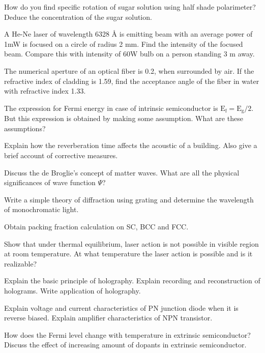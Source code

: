 \item How do you find specific rotation of sugar solution using half shade polarimeter? Deduce
  the concentration of the sugar solution. 
\item A He-Ne laser of wavelength 6328 \AA{} is emitting beam with an average power of 1mW is
  focused on a circle
  of radius 2 mm. Find the intensity of the focused beam. Compare this with intensity of
  60W bulb on a person standing 3 m away.
\item The numerical aperture of an optical fiber is 0.2, when surrounded by air. If the
  refractive index of cladding
  is 1.59, find the acceptance angle of the fiber in water with refractive index 1.33.
\item The expression for Fermi energy in case of intrinsic semiconductor is $\text{E}_{\text{f}} =
  \text{E}_{\text{g}}/2$. But
  this expression is obtained by making some assumption. What are these assumptions?
\item Explain how the reverberation time affects the acoustic of a building. Also give a brief
  account of corrective measures.
\item Discuss the de Broglie's concept of matter waves. What are all the physical significances
  of wave function $\Psi$?

\markB

\newpage \again

\partCo
\item 
\iitem Write a simple theory of diffraction using grating and determine the wavelength of
  monochromatic light.
\Or
\item Obtain packing fraction calculation on SC, BCC and FCC.
\ene

\item \iitem Show that under thermal equilibrium, laser action is not possible in visible region
  at room temperature. At what temperature the laser action is possible and is it realizable?
\Or
\item Explain the basic principle of holography. Explain recording and reconstruction of holograms. 
    Write application of holography.
\ene

\item
\iitem Explain voltage and current characteristics of PN junction diode when it is reverse biased.
  Explain amplifier characteristics of NPN transistor.
\Or
\item How does the Fermi level change with temperature in extrinsic semiconductor? Discuss the effect of
    increasing amount of dopants in extrinsic semiconductor.
\ene

